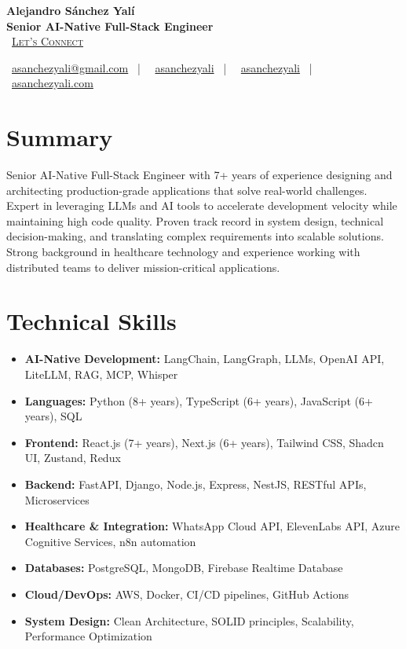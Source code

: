 \documentclass[letterpaper,11pt]{article}
\newcommand{\normalfaCalendar}{{\mdseries\faCalendar}}
\newcommand{\normalfaEnvelope}{{\mdseries\faEnvelope}}
\newcommand{\normalfaLinkedin}{{\mdseries\faLinkedin}}
\newcommand{\normalfaGithub}{{\mdseries\faGithub}}
\newcommand{\normalfaGlobe}{{\mdseries\faGlobe}}
\begin{document}
\begin{center}
\textbf{\Huge Alejandro Sánchez Yalí}\\[0.2em]
\textbf{\Large Senior AI-Native Full-Stack Engineer}\\[0.4em]
\small
\normalfaCalendar\ \href{https://cal.com/asanchezyali/full-time-opportunities}{\textsc{Let's Connect}}

\vspace{0.8em}
\normalfaEnvelope\ \href{mailto:asanchezyali@gmail.com}{asanchezyali@gmail.com}  ~|~
\normalfaLinkedin\ \href{https://www.linkedin.com/in/asanchezyali}{asanchezyali} ~|~
\normalfaGithub\ \href{https://github.com/asanchezyali}{asanchezyali}  ~|~
\normalfaGlobe\ \href{https://asanchezyali.com}{asanchezyali.com}
\end{center}

\section{Summary}
Senior AI-Native Full-Stack Engineer with 7+ years of experience designing and architecting production-grade applications that solve real-world challenges. Expert in leveraging LLMs and AI tools to accelerate development velocity while maintaining high code quality. Proven track record in system design, technical decision-making, and translating complex requirements into scalable solutions. Strong background in healthcare technology and experience working with distributed teams to deliver mission-critical applications.

\section{Technical Skills}
\begin{itemize}[leftmargin=*, itemsep=0pt]
  \item \textbf{AI-Native Development:} LangChain, LangGraph, LLMs, OpenAI API, LiteLLM, RAG, MCP, Whisper
  \item \textbf{Languages:} Python (8+ years), TypeScript (6+ years), JavaScript (6+ years), SQL
  \item \textbf{Frontend:} React.js (7+ years), Next.js (6+ years), Tailwind CSS, Shadcn UI, Zustand, Redux
  \item \textbf{Backend:} FastAPI, Django, Node.js, Express, NestJS, RESTful APIs, Microservices
  \item \textbf{Healthcare \& Integration:} WhatsApp Cloud API, ElevenLabs API, Azure Cognitive Services, n8n automation
  \item \textbf{Databases:} PostgreSQL, MongoDB, Firebase Realtime Database
  \item \textbf{Cloud/DevOps:} AWS, Docker, CI/CD pipelines, GitHub Actions
  \item \textbf{System Design:} Clean Architecture, SOLID principles, Scalability, Performance Optimization
\end{itemize}
\end{document}
